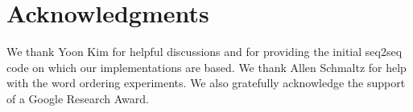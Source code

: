 \documentclass[11pt,letterpaper]{article}
\begin{document}


\section*{Acknowledgments} We thank Yoon Kim for helpful discussions and for providing the initial seq2seq code on which our implementations are based. We thank Allen Schmaltz for help with the word ordering experiments. We also gratefully acknowledge the support of a Google Research Award.

\nocite{bahdanau16an}



\end{document}
